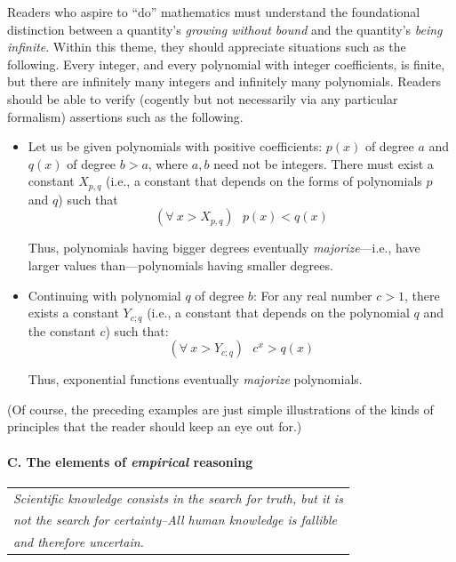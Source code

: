 Readers who aspire to ``do'' mathematics must understand the foundational distinction between a quantity's {\em growing without bound} and the quantity's {\em being infinite}.  Within this theme, they should appreciate situations such as the following.  Every integer, and every polynomial with integer coefficients, is finite, but there are infinitely many integers and infinitely many polynomials.  Readers should be able to verify (cogently but not necessarily via any particular formalism) assertions such as the following.
\begin{itemize}
\item
Let us be given polynomials with positive coefficients: $p(x)$ of degree $a$ and $q(x)$ of degree $b > a$, where $a, b$ need not be integers.  There must exist a constant $X_{p,q}$ (i.e., a constant that depends on the forms of polynomials $p$ and $q$) such that
\[ (\forall \ x > X_{p,q}) \ \ \ p(x) < q(x) \]

\smallskip


Thus, polynomials having bigger degrees eventually {\em majorize}---i.e., have larger values than---polynomials having smaller degrees.

\medskip\item
Continuing with polynomial $q$ of degree $b$: For any real number $c > 1$, there exists a constant $Y_{c;q}$ (i.e., a constant that depends on the polynomial $q$ and the constant $c$) such that:
\[ (\forall \ x >  Y_{c;q}) \ \ \ c^x > q(x) \]

\smallskip

Thus, exponential functions eventually {\em majorize} polynomials.
\end{itemize}
(Of course, the preceding examples are just simple illustrations of the kinds of principles that the reader should keep an eye out for.)

\paragraph{C. The elements of {\em empirical} reasoning}

\bigskip

\hfill
\begin{tabular}{l}
{\em Scientific knowledge consists in the search for truth, but it is} \\
{\em not the search for certainty--All human knowledge is fallible} \\
{\em and therefore uncertain.}
\end{tabular}

